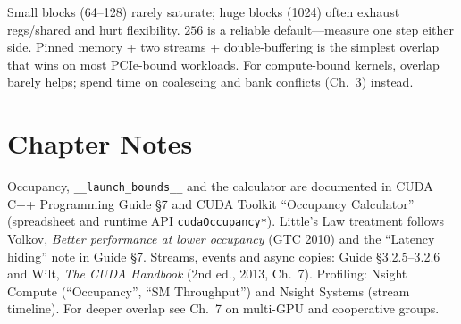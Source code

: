\begin{remark}
Small blocks (64--128) rarely saturate; huge blocks (1024) often exhaust regs/shared and hurt flexibility. $256$ is a reliable default---measure one step either side. Pinned memory + two streams + double-buffering is the simplest overlap that wins on most PCIe-bound workloads. For compute-bound kernels, overlap barely helps; spend time on coalescing and bank conflicts (Ch.~3) instead.
\end{remark}

\smallskip


\section*{Chapter Notes}
Occupancy, \texttt{\_\_launch\_bounds\_\_} and the calculator are documented in CUDA C++ Programming Guide \S7 and CUDA Toolkit ``Occupancy Calculator'' (spreadsheet and runtime API \texttt{cudaOccupancy*}). Little's Law treatment follows Volkov, \emph{Better performance at lower occupancy} (GTC 2010) and the ``Latency hiding'' note in Guide \S7. Streams, events and async copies: Guide \S3.2.5--3.2.6 and Wilt, \emph{The CUDA Handbook} (2nd ed., 2013, Ch.~7). Profiling: Nsight Compute (``Occupancy'', ``SM Throughput'') and Nsight Systems (stream timeline). For deeper overlap see Ch.~7 on multi-GPU and cooperative groups.
